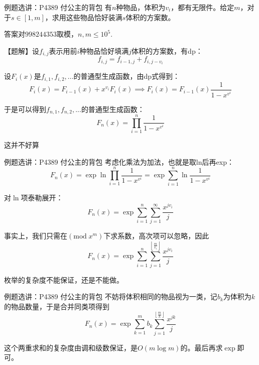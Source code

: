 \documentclass{beamer}
\begin{document}
\begin{frame}{例题选讲：P4389 付公主的背包}
    \small
    有$n$种物品，体积为$v_i$，都有无限件。给定$m$，对于$s\in[1,m]$，求用这些物品恰好装满$s$体积的方案数。

    答案对$998244353$取模，$n,m\leq 10^5$.

    \vspace{1em}\pause
    【题解】设$f_{i,j}$表示用前$i$种物品恰好填满$j$体积的方案数，有dp：
    \begin{equation*}
        f_{i,j}=f_{i-1,j}+f_{i,j-v_i}
    \end{equation*}

    \pause
    设$F_i(x)$是$f_{i,1},f_{i,2},...$的普通型生成函数，由dp式得到：
    \begin{equation*}
        F_i(x)=F_{i-1}(x)+x^{v_i}F_i(x)\implies F_i(x)=F_{i-1}(x)\frac{1}{1-x^{v^i}}
    \end{equation*}
    
    于是可以得到$f_{n,1},f_{n,2},...$的普通型生成函数：
    \begin{equation*}
        F_n(x)=\prod_{i=1}^n \frac{1}{1-x^{v^i}}
    \end{equation*}
    
    这并不好算
\end{frame}

\begin{frame}{例题选讲：P4389 付公主的背包}
    \small
    考虑化乘法为加法，也就是取ln后再exp：
    \begin{equation*}
        F_n(x)=\exp \ln \prod_{i=1}^n \frac{1}{1-x^{v^i}}= \exp \sum_{i=1}^n \ln \frac{1}{1-x^{v^i}}
    \end{equation*}

    \pause
    对$\ln$项泰勒展开：
    \begin{equation*}
        F_n(x)=\exp \sum_{i=1}^n \sum_{j=1}^\infty \frac{x^{jv_i}}{j}
    \end{equation*}

    \pause
    事实上，我们只需在$(\text{mod}\; x^m)$下求系数，高次项可以忽略，因此
    \begin{equation*}
        F_n(x)=\exp \sum_{i=1}^n \sum_{j=1}^{\left\lfloor \frac{m}{v_i}\right\rfloor} \frac{x^{jv_i}}{j}
    \end{equation*}

    枚举的复杂度不能保证，还是不能做。
\end{frame}

\begin{frame}{例题选讲：P4389 付公主的背包}
    \small
    不妨将体积相同的物品视为一类，记$b_k$为体积为$k$的物品数量，于是合并同类项得到
    \begin{equation*}
        F_n(x)=\exp \sum_{k=1}^m b_k \sum_{j=1}^{\left\lfloor \frac{m}{k}\right\rfloor} \frac{x^{jk}}{j}
    \end{equation*}

    这个两重求和的复杂度由调和级数保证，是$O(m\log m)$的。最后再求$\exp$即可。
\end{frame}
\end{document}

